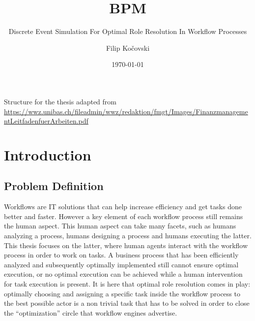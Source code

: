 \documentclass{seal_thesis}
\date{\today}
\title{BPM}
\subtitle{Discrete Event Simulation For Optimal Role Resolution In Workflow Processes}
\author{Filip Ko\v{c}ovski}
\begin{document}
\maketitle

\frontmatter

\begin{acknowledgements}

\end{acknowledgements}

\begin{abstract}

\end{abstract}

\begin{zusammenfassung}

\end{zusammenfassung}

\tableofcontents
\listoffigures
\listoftables
\lstlistoflistings

\pagebreak

\mainmatter

Structure for the thesis adapted from \url{https://wwz.unibas.ch/fileadmin/wwz/redaktion/fmgt/Images/FinanzmanagementLeitfadenfuerArbeiten.pdf}

\chapter{Introduction}
\label{ch:intro}

\section{Problem Definition}

Workflows are IT solutions that can help increase efficiency and get tasks done better and faster. However a key element of each workflow process still remains the human aspect. This human aspect can take many facets, such as humans analyzing a process, humans designing a process and humans executing the latter. This thesis focuses on the latter, \ie where human agents interact with the workflow process in order to work on tasks. A business process that has been efficiently analyzed and subsequently optimally implemented still cannot ensure optimal execution, or no optimal execution can be achieved while a human intervention for task execution is present. It is here that optimal role resolution comes in play: optimally choosing and assigning a specific task inside the workflow process to the best possible actor is a non trivial task that has to be solved in order to close the ``optimization'' circle that workflow engines advertise.
\end{document}
